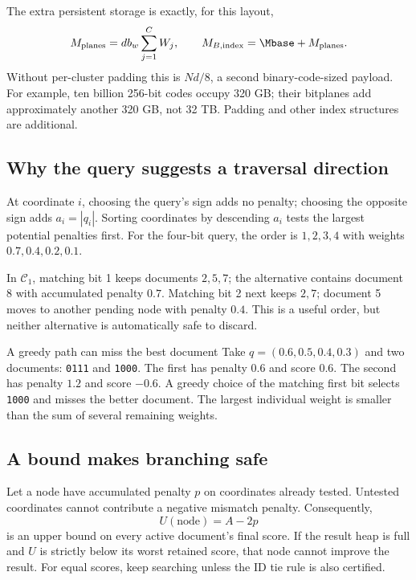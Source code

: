 The extra persistent storage is exactly, for this layout,
\begin{equation}
M_{\rm planes}=d b_w\sum_{j=1}^{C}W_j,
\qquad M_{B,\rm index}=\Mbase+M_{\rm planes}.
\label{eq:planes-storage}
\end{equation}
Without per-cluster padding this is $Nd/8$, a second binary-code-sized payload.
For example, ten billion 256-bit codes occupy 320 GB; their bitplanes add approximately
another 320 GB, not 32 TB. Padding and other index structures are additional.

\subsection{Why the query suggests a traversal direction}
At coordinate $i$, choosing the query's sign adds no penalty; choosing the opposite sign adds
$a_i=|q_i|$. Sorting coordinates by descending $a_i$ tests the largest potential penalties first.
For the four-bit query, the order is $1,2,3,4$ with weights $0.7,0.4,0.2,0.1$.

In $\mathcal C_1$, matching bit 1 keeps documents $2,5,7$; the alternative contains document 8
with accumulated penalty $0.7$. Matching bit 2 next keeps $2,7$; document 5 moves to another
pending node with penalty $0.4$. This is a useful order, but neither alternative is automatically
safe to discard.

\begin{examplebox}{A greedy path can miss the best document}
Take $q=(0.6,0.5,0.4,0.3)$ and two documents: \texttt{0111} and \texttt{1000}.
The first has penalty $0.6$ and score $0.6$. The second has penalty $1.2$ and score $-0.6$.
A greedy choice of the matching first bit selects \texttt{1000} and misses the better document.
The largest individual weight is smaller than the sum of several remaining weights.
\end{examplebox}

\subsection{A bound makes branching safe}
Let a node have accumulated penalty $p$ on coordinates already tested. Untested coordinates
cannot contribute a negative mismatch penalty. Consequently,
\begin{equation}
U(\text{node})=A-2p
\label{eq:branch-bound}
\end{equation}
is an upper bound on every active document's final score. If the result heap is full and
$U$ is strictly below its worst retained score, that node cannot improve the result.
For equal scores, keep searching unless the ID tie rule is also certified.

